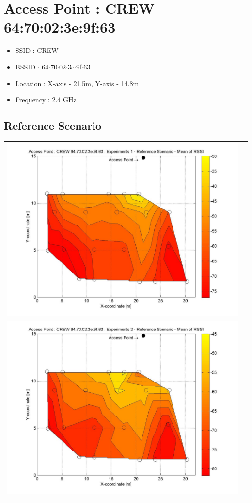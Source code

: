\documentclass[11pt,a4paper,headinclude,footinclude,chapterprefix=on]{scrreprt}
\begin{document}
\pagebreak 
\section{Access Point : CREW 64:70:02:3e:9f:63} 
\begin{itemize}
	\item SSID : CREW 
	\item BSSID : 64:70:02:3e:9f:63 
	\item Location : X-axis - 21.5m, Y-axis - 14.8m 
	\item Frequency : 2.4 GHz 
\end{itemize}
\subsection{Reference Scenario} 
\begin{longtable}
	{lr} 
	\includegraphics[width=13cm]{../../Source/plot/CREW_63/63_Ref_Ex_1_Mean.jpg} \\
	\includegraphics[width=13cm]{../../Source/plot/CREW_63/63_Ref_Ex_2_Mean.jpg} \\

\end{longtable}
\end{document}
